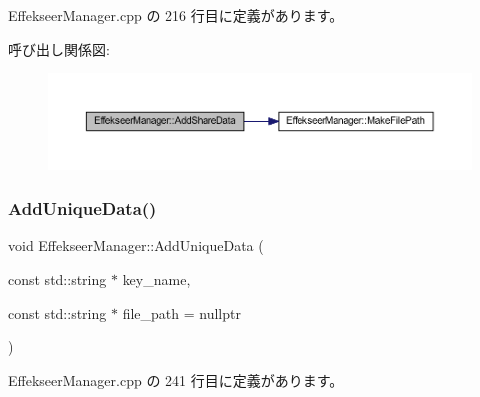  Effekseer\+Manager.\+cpp の 216 行目に定義があります。

呼び出し関係図\+:\nopagebreak
\begin{figure}[H]
\begin{center}
\leavevmode
\includegraphics[width=350pt]{class_effekseer_manager_aec98cb9052d849cae3f9cfee80c4c873_cgraph}
\end{center}
\end{figure}
\mbox{\label{class_effekseer_manager_ad89f0ad2a840f191c088d35ddfd2ec62}} 
\subsubsection{\texorpdfstring{Add\+Unique\+Data()}{AddUniqueData()}}
{\footnotesize\ttfamily void Effekseer\+Manager\+::\+Add\+Unique\+Data (\begin{DoxyParamCaption}\item[{const std\+::string $\ast$}]{key\+\_\+name,  }\item[{const std\+::string $\ast$}]{file\+\_\+path = {\ttfamily nullptr} }\end{DoxyParamCaption})\hspace{0.3cm}{\ttfamily [static]}}



 Effekseer\+Manager.\+cpp の 241 行目に定義があります。

